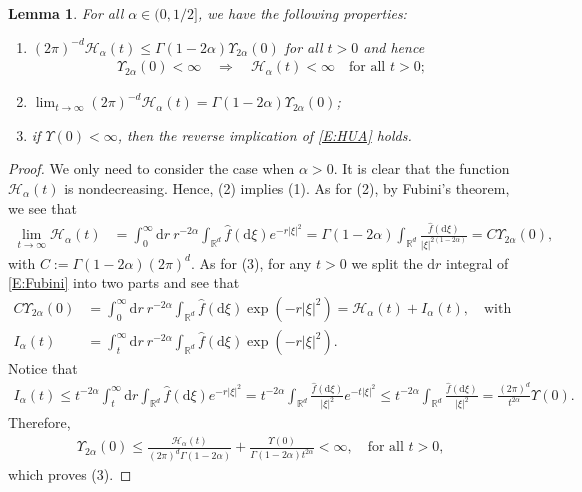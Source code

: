 \documentclass[12pt]{report}
\theoremstyle{plain}
\newtheorem{lemma}[theorem]{Lemma}
\theoremstyle{definition}
\numberwithin{equation}{section}
\newcommand{\R}{\mathbb{R}}
\newcommand{\ud}{\ensuremath{ \mathrm{d} }}
\begin{document}
\begin{lemma} \label{L:HUA}
	For all $\alpha\in (0,1/2]$, we have the following properties:
	\begin{enumerate}[(1)]
		\item $\left(2\pi\right)^{-d}\mathcal{H}_\alpha(t)\le
		\Gamma\left(1-2\alpha\right)\Upsilon_{2\alpha}(0)$ for all $t>0$ and hence
		\begin{align} \label{E:HUA}
		\Upsilon_{2\alpha}(0)<\infty \quad \Longrightarrow \quad \mathcal{H}_\alpha(t)<\infty \quad \text{for
			all $t>0$};
		\end{align}
		\item $\lim_{t\to\infty}\left(2\pi\right)^{-d}\mathcal{H}_\alpha(t)= \Gamma\left(1-2\alpha\right)
		\Upsilon_{2\alpha}(0)$;
		\item if $\Upsilon(0)<\infty$, then the reverse implication of \eqref{E:HUA} holds.
	\end{enumerate}
\end{lemma}
\begin{proof}
	We only need to consider the case when $\alpha>0$.
	It is clear that the function $\mathcal{H}_\alpha(t)$ is nondecreasing. Hence, (2) implies (1). As
	for (2), by Fubini's theorem, we see that
	\begin{align} \label{E:Fubini}
	\lim_{t\to\infty}\mathcal{H}_\alpha(t)
	& = \int_0^\infty \ud r \: r^{-2\alpha} \int_{\R^d} \widehat{f}(\ud\xi)e^{ -r|\xi|^2 }
	= \Gamma(1-2\alpha) \int_{\R^d} \frac{\widehat{f}(\ud\xi)}{|\xi|^{2\left(1-2\alpha\right)}}
	= C \Upsilon_{2\alpha}(0),
	\end{align}
	with $C:=\Gamma(1-2\alpha)(2\pi)^d$. As for (3), for any $t>0$ we split the $\ud r$ integral of \eqref{E:Fubini} into two parts and see that
	\begin{align*}
	C \Upsilon_{2\alpha}(0) & = \int_0^\infty \ud r \: r^{-2\alpha} \int_{\R^d} \widehat{f}(\ud\xi)\exp\left(-r|\xi|^2\right) = \mathcal{H}_\alpha(t) + I_\alpha(t), \quad \text{with} \\
	I_\alpha(t)             & = \int_t^\infty \ud r \: r^{-2\alpha} \int_{\R^d}
	\widehat{f}(\ud\xi)\exp\left(-r|\xi|^2\right).
	\end{align*}
	Notice that
	\begin{align*}
	I_\alpha(t) \le t^{-2\alpha} \int_t^\infty \ud r \int_{\R^d} \widehat{f}(\ud\xi)e^{-r|\xi|^2}
	= t^{-2\alpha} \int_{\R^d} \frac{\widehat{f}(\ud\xi)}{|\xi|^2} e^{-t|\xi|^2}
	\le t^{-2\alpha} \int_{\R^d} \frac{\widehat{f}(\ud\xi)}{|\xi|^2}
	=\frac{\left(2\pi\right)^d}{t^{2\alpha}} \Upsilon(0).
	\end{align*}
	Therefore,
	\begin{align*}
	\Upsilon_{2\alpha}(0) \le \frac{\mathcal{H}_\alpha(t)}{(2\pi)^d\Gamma(1-2\alpha)} +
	\frac{\Upsilon(0)}{\Gamma\left(1-2\alpha\right)t^{2\alpha}} <\infty, \quad \text{for all $t>0$,}
	\end{align*}
	which proves (3).
\end{proof}
\end{document}

